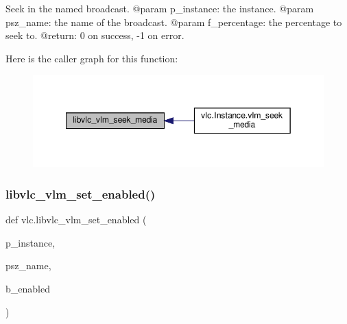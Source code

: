 \begin{DoxyVerb}Seek in the named broadcast.
@param p_instance: the instance.
@param psz_name: the name of the broadcast.
@param f_percentage: the percentage to seek to.
@return: 0 on success, -1 on error.
\end{DoxyVerb}
 Here is the caller graph for this function\+:
\nopagebreak
\begin{figure}[H]
\begin{center}
\leavevmode
\includegraphics[width=349pt]{namespacevlc_a0cdf20f1c8371b2f626c6bee76089a91_icgraph}
\end{center}
\end{figure}
\mbox{\label{namespacevlc_affb9bce216fa7e0b538a0d907e657c2c}} 
\subsubsection{\texorpdfstring{libvlc\+\_\+vlm\+\_\+set\+\_\+enabled()}{libvlc\_vlm\_set\_enabled()}}
{\footnotesize\ttfamily def vlc.\+libvlc\+\_\+vlm\+\_\+set\+\_\+enabled (\begin{DoxyParamCaption}\item[{}]{p\+\_\+instance,  }\item[{}]{psz\+\_\+name,  }\item[{}]{b\+\_\+enabled }\end{DoxyParamCaption})}

